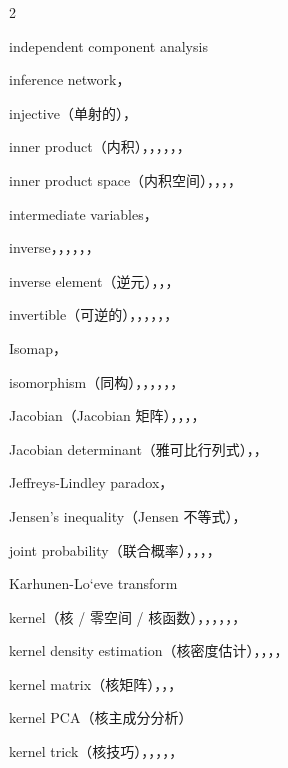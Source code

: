 \begin{multicols}{2}
\medskip{}\par\smallskip
\noindent independent component analysis\par
\noindent inference network，\par
\noindent injective（单射的），\par
\noindent inner product（内积），，，，，，\par
\noindent inner product space（内积空间），，，，\par
\noindent intermediate variables，\par
\noindent inverse，，，，，，\par
\noindent inverse element（逆元），，，\par
\noindent invertible（可逆的），，，，，，\par
\noindent Isomap，\par
\noindent isomorphism（同构），，，，，，\par

\medskip{}\par\smallskip
\noindent Jacobian（Jacobian 矩阵），，，，\par
\noindent Jacobian determinant（雅可比行列式），，\par
\noindent Jeffreys-Lindley paradox，\par
\noindent Jensen’s inequality（Jensen 不等式），\par
\noindent joint probability（联合概率），，，，\par

\medskip{}\par\smallskip
\noindent Karhunen-Lo`eve transform\par
\noindent kernel（核 / 零空间 / 核函数），，，，，，\par
\noindent kernel density estimation（核密度估计），，，，\par
\noindent kernel matrix（核矩阵），，，\par
\noindent kernel PCA（核主成分分析）\par
\noindent kernel trick（核技巧），，，，，\par


\end{multicols}
